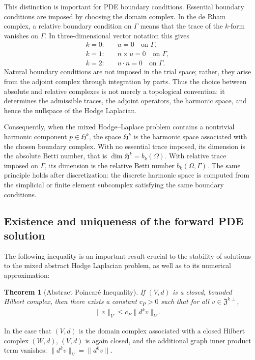 \documentclass{article}
\newtheorem{theorem}{Theorem}[section]
\newcommand{\f}[1]{\mathfrak{#1}}
\begin{document}
This distinction is important for PDE boundary conditions.  Essential boundary
conditions are imposed by choosing the domain complex.  In the de Rham complex,
a relative boundary condition on $\Gamma$ means that the trace of the
$k$-form vanishes on $\Gamma$.  In three-dimensional vector notation this gives
\begin{align*}
	k=0:\quad &u=0 \quad \text{on }\Gamma,\\
	k=1:\quad &n\times u=0 \quad \text{on }\Gamma,\\
	k=2:\quad &u\cdot n=0 \quad \text{on }\Gamma.
\end{align*}
Natural boundary conditions are not imposed in the trial space; rather, they
arise from the adjoint complex through integration by parts.  Thus the choice
between absolute and relative complexes is not merely a topological convention:
it determines the admissible traces, the adjoint operators, the harmonic space,
and hence the nullspace of the Hodge Laplacian.

Consequently, when the mixed Hodge--Laplace problem contains a nontrivial harmonic component $p\in \f H^k$, the space $\f H^k$ is the harmonic space associated with the chosen boundary
complex.  With no essential trace imposed, its dimension is the absolute Betti
number, that is $\dim \f H^k = b_k(\Omega)$.  With relative trace imposed on $\Gamma$, its dimension is
the relative Betti number $b_k(\Omega,\Gamma)$.  The same principle holds after
discretization: the discrete harmonic space is computed from the simplicial or
finite element subcomplex satisfying the same boundary conditions.
\subsection{Existence and uniqueness of the forward PDE solution}


The following inequality is an important result crucial to the stability of solutions to the mixed abstract Hodge Laplacian problem, as well as to its numerical approximation:
\begin{theorem}[Abstract Poincar\'e Inequality] If $(V,d)$ is a closed, bounded Hilbert complex, then there exists a constant $c_{P} >0$ such that for all $v \in \f Z^{k\perp}$,
	\begin{gather}
		\|v\|_{V} \leq c_{P} \|d^{k}v\|_{V}.
	\end{gather}
\end{theorem}
In the case that $(V,d)$ is the domain complex associated with a closed Hilbert complex $(W,d)$, $(V,d)$ is again closed, and the additional graph inner product term vanishes: $\|d^{k} v\|_{V} = \|d^{k}v\|$.
\end{document}
